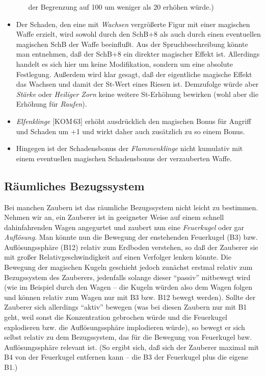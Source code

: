 \documentclass[10pt,a4paper,germanpar]{article}
\begin{document}
\begin{itemize}
\begin{itemize}
    der Begrenzung auf 100 um weniger als 20 erhöhen würde.)
  \end{itemize}
\item Der Schaden, den eine mit \emph{Wachsen} vergrößerte Figur mit
  einer magischen Waffe erzielt, wird sowohl durch den SchB+8 als auch
  durch einen eventuellen magischen SchB der Waffe beeinflußt. Aus der
  Spruchbeschreibung könnte man entnehmen, daß der SchB+8 ein direkter
  magischer Effekt ist. Allerdings handelt es sich hier um keine
  Modifikation, sondern um eine absolute Festlegung. Außerdem wird
  klar gesagt, daß der eigentliche magische Effekt das Wachsen und
  damit der St-Wert eines Riesen ist. Demzufolge würde aber
  \emph{Stärke} oder \emph{Heiliger Zorn} keine weitere St-Erhöhung
  bewirken (wohl aber die Erhöhung für \emph{Raufen}).
\item \emph{Elfenklinge} [KOM\,63] erhöht ausdrücklich den magischen
  Bonus für Angriff und Schaden um +1 und wirkt daher auch zusätzlich
  zu so einem Bonus.
\item Hingegen ist der Schadensbonus der \emph{Flammenklinge} nicht
  kumulativ mit einem eventuellen magischen Schadensbonus der
  verzauberten Waffe.
\end{itemize}

\subsection{Räumliches Bezugssystem}

Bei manchen Zaubern ist das räumliche Bezugssystem nicht leicht zu
bestimmen. Nehmen wir an, ein Zauberer ist in geeigneter Weise auf
einem schnell dahinfahrenden Wagen angegurtet und zaubert nun eine
\emph{Feuerkugel} oder gar \emph{Auflösung}. Man könnte nun die
Bewegung der enstehenden Feuerkugel (B3) bzw. Auflösungssphäre (B12)
relativ zum Erdboden verstehen, so daß der Zauberer sie mit großer
Relativgeschwindigkeit auf einen Verfolger lenken könnte. Die Bewegung
der magischen Kugeln geschieht jedoch zunächst erstmal relativ zum
Bezugssystem des Zauberers, jedenfalls solange dieser "`passiv"'
mitbewegt wird (wie im Beispiel durch den Wagen -- die Kugeln würden
also dem Wagen folgen und können relativ zum Wagen nur mit B3 bzw. B12
bewegt werden). Sollte der Zauberer sich allerdings "`aktiv"' bewegen
(was bei diesen Zaubern nur mit B1 geht, weil sonst die Konzentration
gebrochen würde und die Feuerkugel explodieren bzw. die
Auflösungssphäre implodieren würde), so bewegt er sich selbst relativ
zu dem Bezugssystem, das für die Bewegung von Feuerkugel
bzw. Auflösungssphäre relevant ist. (So ergibt sich, daß sich der
Zauberer maximal mit B4 von der Feuerkugel entfernen kann -- die B3
der Feuerkugel plus die eigene B1.)
\end{document}
